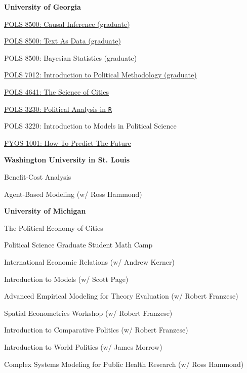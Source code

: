 \documentclass[margin,line]{res}
\newenvironment{list1}{
  \begin{list}{}{%
      \setlength{\itemsep}{0.1in}
      \setlength{\parsep}{0in} \setlength{\parskip}{0in}
      \setlength{\topsep}{0.1in} \setlength{\partopsep}{0in} 
      \setlength{\leftmargin}{0.17in}}}{\end{list}}
\begin{document}
\begin{resume}
\textbf{University of Georgia}
\begin{list1}
	\item[] \href{https://github.com/joeornstein/causal-inference/}{POLS 8500: Causal Inference (graduate)}
	\item[] \href{https://joeornstein.github.io/text-as-data/}{POLS 8500: Text As Data (graduate)}
	\item[] POLS 8500: Bayesian Statistics (graduate)
	\item[] \href{https://joeornstein.github.io/pols-7012//}{POLS 7012: Introduction to Political Methodology (graduate)}
	\item[] \href{https://joeornstein.github.io/pols-4641/}{POLS 4641: The Science of Cities}
	\item[] \href{https://joeornstein.github.io/pols-3230/}{POLS 3230: Political Analysis in \texttt{R}}
	\item[] POLS 3220: Introduction to Models in Political Science
	\item[] \href{https://joeornstein.github.io/how-to-predict-the-future/}{FYOS 1001: How To Predict The Future}
\end{list1}

\textbf{Washington University in St. Louis}
\begin{list1}
	\item[] Benefit-Cost Analysis
	\item[] Agent-Based Modeling (w/ Ross Hammond)
\end{list1}

\textbf{University of Michigan}
\begin{list1}
	\item[] The Political Economy of Cities
	\item[] Political Science Graduate Student Math Camp
	\item International Economic Relations (w/ Andrew Kerner)
	\item Introduction to Models (w/ Scott Page)
	\item Advanced Empirical Modeling for Theory Evaluation (w/ Robert Franzese)
	\item Spatial Econometrics Workshop (w/ Robert Franzese)
	\item Introduction to Comparative Politics (w/ Robert Franzese)
	\item Introduction to World Politics (w/ James Morrow)
	\item Complex Systems Modeling for Public Health Research (w/ Ross Hammond)
\end{list1}




\end{resume}
\end{document}
